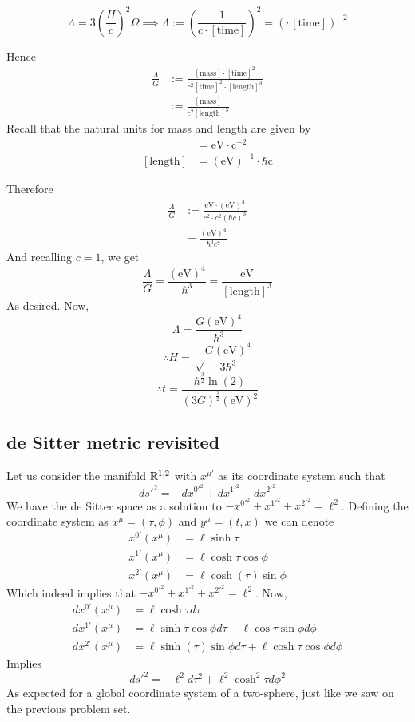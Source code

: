 \documentclass{article}
\begin{document}
		$$ \Lambda = 3 \left( \frac{H}{c} \right)^2 \Omega \implies \Lambda:= \left( \frac{1}{c\cdot[\text{time}]} \right)^2 = (c[\text{time}])^{-2}$$
	
		Hence
		\begin{align*}
			\frac{\Lambda}{G} &:= \frac{[\text{mass}] \cdot[\text{time}]^2}{c^2[\text{time}]^2 \cdot[\text{length}]^3} \\
			&:= \frac{[\text{mass}] }{c^2[\text{length}]^3}
		\end{align*}
		Recall that the natural units for mass and length are given by
		\begin{align*}
			[\text{mass}] &= \text{eV}\cdot \text{c}^{-2} \\
			[\text{length}] &= (\text{eV})^{-1} \cdot{\hbar\text{c}}
		\end{align*}
		
		Therefore
		\begin{align*}
			\frac{\Lambda}{G} &:= \frac{\text{eV} \cdot (\text{eV})^3}{c^2 \cdot c^2 (\hbar c)^3} \\
			&= \frac{(\text{eV})^4}{\hbar^3 c^7}
		\end{align*}
		And recalling $c=1$, we get
		$$ \boxed{\frac\Lambda{G} = \frac{(\text{eV})^4}{\hbar^3} = \frac{\text{eV}}{[\text{length}]^3}}$$
		As desired. Now,
		$$ \Lambda = \frac{G(\text{eV})^4}{\hbar^3}$$
		$$ \therefore \boxed{H = \sqrt\frac{G(\text{eV})^4}{3\hbar^3}}
		$$
		$$ \therefore \boxed{t = \frac{\hbar^{\frac{3}{2}} \ln(2)}{(3G)^{\frac{1}{2}} (\text{eV})^2}}$$
		
		\subsection{de Sitter metric revisited}
		Let us consider the manifold $\mathbb{R}^{1,2}$ with $x^{\mu'}$ as its coordinate system such that
		$$ ds'^2 = -dx^{0'^{2}} + dx^{1'^2} + dx^{2'^2}$$ 
		We have the de Sitter space as a solution to $-x^{0'^2} + x^{1'^2} + x^{2'^2} = \ell^2$. Defining the coordinate system as $x^\mu = (\tau ,\phi)$ and $y^\mu = (t,x)$ we can denote
		\begin{align*}
			x^{0'} \left( x^\mu \right) &= \ell \sinh \tau \\
			x^{1'} \left( x^\mu \right) &= \ell \cosh \tau \cos\phi \\
			x^{2'} \left( x^\mu \right) &= \ell \cosh (\tau) \sin\phi 
		\end{align*}
		Which indeed implies that $-x^{0'^2} + x^{1'^2} + x^{2'^2} = \ell^2$. Now,
		\begin{align*}
			dx^{0'} \left( x^\mu \right) &= \ell \cosh \tau d\tau\\
			dx^{1'} \left( x^\mu \right) &= \ell \sinh \tau \cos\phi d\tau - \ell \cos \tau \sin \phi d \phi \\
			dx^{2'} \left( x^\mu \right) &= \ell \sinh (\tau) \sin\phi d\tau + \ell \cosh \tau \cos \phi d\phi
		\end{align*}
		Implies
		$$ \boxed{ds'^2 = -\ell^2 d\tau^2 + \ell^2 \cosh^2 \tau d \phi^2}$$
		As expected for a global coordinate system of a two-sphere, just like we saw on the previous problem set.
		\pagebreak
\end{document}
